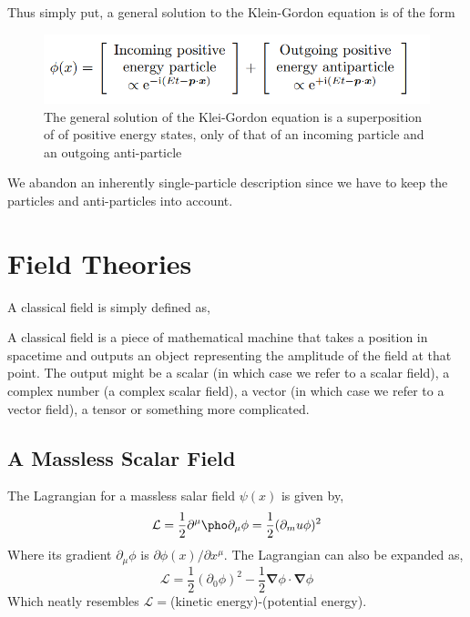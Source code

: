 Thus simply put, a general solution to the Klein-Gordon equation is of the form
\begin{figure}
	\centering
	\includegraphics[scale=0.8]{Figures/anti.png}
	\caption{The general solution of the Klei-Gordon equation is a superposition of of positive energy states, only of that of an incoming particle and an outgoing anti-particle}
\end{figure}
We abandon an inherently single-particle description since we have to keep the particles and anti-particles into account.
\section{Field Theories}
A classical field is simply defined as,
\begin{tcolorbox}
A classical field is a piece of mathematical machine that takes a position in spacetime and outputs an object representing the amplitude of the field at that point. The output might be a scalar (in which case we refer to a scalar field), a complex number (a complex scalar field), a vector (in which case we refer to a vector field), a tensor or something more complicated.
\end{tcolorbox}
\subsection{A Massless Scalar Field}
The Lagrangian for a massless salar field $\psi(x)$ is given by,
\begin{equation}
    \mathcal{L}=\frac{1}{2}\partial^\mu\pho\partial_\mu\phi=\frac{1}{2}(\partial_mu\phi)^2
\end{equation}
Where its gradient $\partial_\mu\phi$ is $\partial\phi(x)/\partial x^\mu$. The Lagrangian can also be expanded as,
\begin{equation}
    \mathcal{L}=\frac{1}{2}(\partial_0\phi)^2-\frac{1}{2}\mathbf{\nabla}\phi\cdot\mathbf{\nabla}\phi
\end{equation}
Which neatly resembles $\mathcal{L}=$(kinetic energy)-(potential energy).
